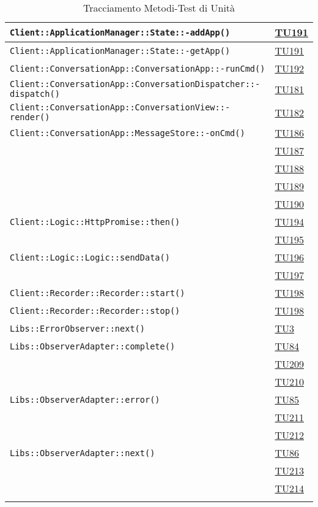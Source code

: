 \begin{longtable}{|>{\centering}m{12cm}|m{1cm}<{\centering}|}
\texttt{Client::ApplicationManager::State::-\linebreak addApp()} & \hyperlink{TU191}{TU191}\\ \hline
\texttt{Client::ApplicationManager::State::-\linebreak getApp()} & \hyperlink{TU191}{TU191}\\ \hline
\texttt{Client::ConversationApp::ConversationApp::-\linebreak runCmd()} & \hyperlink{TU192}{TU192}\\ \hline
\texttt{Client::ConversationApp::ConversationDispatcher::-\linebreak dispatch()} & \hyperlink{TU181}{TU181}\\ \hline
\texttt{Client::ConversationApp::ConversationView::-\linebreak render()} & \hyperlink{TU182}{TU182}\\ \hline
\texttt{Client::ConversationApp::MessageStore::-\linebreak onCmd()} & \hyperlink{TU186}{TU186}\\ & \hyperlink{TU187}{TU187}\\ & \hyperlink{TU188}{TU188}\\ & \hyperlink{TU189}{TU189}\\ & \hyperlink{TU190}{TU190}\\ \hline
\texttt{Client::Logic::HttpPromise::then()} & \hyperlink{TU194}{TU194}\\ & \hyperlink{TU195}{TU195}\\ \hline
\texttt{Client::Logic::Logic::sendData()} & \hyperlink{TU196}{TU196}\\ & \hyperlink{TU197}{TU197}\\ \hline
\texttt{Client::Recorder::Recorder::start()} & \hyperlink{TU198}{TU198}\\ \hline
\texttt{Client::Recorder::Recorder::stop()} & \hyperlink{TU198}{TU198}\\ \hline
\texttt{Libs::ErrorObserver::next()} & \hyperlink{TU3}{TU3}\\ \hline
\texttt{Libs::ObserverAdapter::complete()} & \hyperlink{TU84}{TU84}\\ & \hyperlink{TU209}{TU209}\\ & \hyperlink{TU210}{TU210}\\ \hline
\texttt{Libs::ObserverAdapter::error()} & \hyperlink{TU85}{TU85}\\ & \hyperlink{TU211}{TU211}\\ & \hyperlink{TU212}{TU212}\\ \hline
\texttt{Libs::ObserverAdapter::next()} & \hyperlink{TU86}{TU86}\\ & \hyperlink{TU213}{TU213}\\ & \hyperlink{TU214}{TU214}\\ \hline

\caption[Tracciamento Metodi-Test di Unità]{Tracciamento Metodi-Test di Unità}
\label{tabella:met-tu}
\end{longtable}
\clearpage
